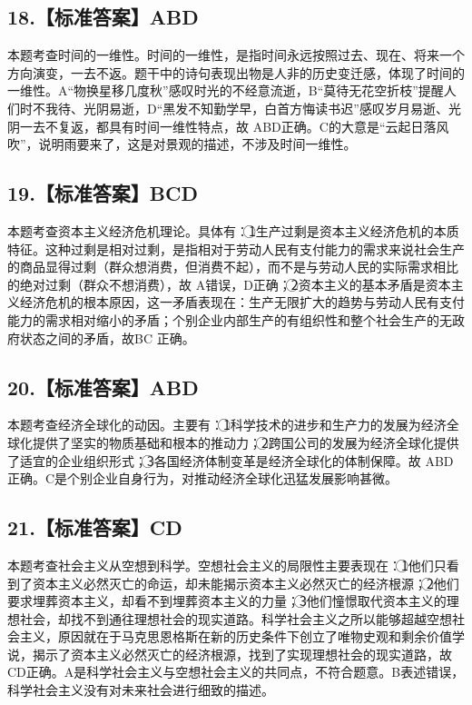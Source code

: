\documentclass[UTF8,11pt]{ctexart}
\begin{document}
\subsection*{18.【标准答案】ABD}

本题考查时间的一维性。时间的一维性，是指时间永远按照过去、现在、将来一个方向演变，一去不返。题干中的诗句表现出物是人非的历史变迁感，体现了时间的一维性。A“物换星移几度秋”感叹时光的不经意流逝，B“莫待无花空折枝”提醒人们时不我待、光阴易逝，D“黑发不知勤学早，白首方悔读书迟”感叹岁月易逝、光阴一去不复返，都具有时间一维性特点，故 ABD正确。C的大意是“云起日落风吹”，说明雨要来了，这是对景观的描述，不涉及时间一维性。


\subsection*{19.【标准答案】BCD}

本题考查资本主义经济危机理论。具体有：\textcircled{1}生产过剩是资本主义经济危机的本质特征。这种过剩是相对过剩，是指相对于劳动人民有支付能力的需求来说社会生产的商品显得过剩（群众想消费，但消费不起），而不是与劳动人民的实际需求相比的绝对过剩（群众不想消费），故 A错误，D正确；\textcircled{2}资本主义的基本矛盾是资本主义经济危机的根本原因，这一矛盾表现在：生产无限扩大的趋势与劳动人民有支付能力的需求相对缩小的矛盾；个别企业内部生产的有组织性和整个社会生产的无政府状态之间的矛盾，故BC 正确。


\subsection*{20.【标准答案】ABD}

本题考查经济全球化的动因。主要有：\textcircled{1}科学技术的进步和生产力的发展为经济全球化提供了坚实的物质基础和根本的推动力；\textcircled{2}跨国公司的发展为经济全球化提供了适宜的企业组织形式；\textcircled{3}各国经济体制变革是经济全球化的体制保障。故 ABD 正确。C是个别企业自身行为，对推动经济全球化迅猛发展影响甚微。


\subsection*{21.【标准答案】CD}

本题考查社会主义从空想到科学。空想社会主义的局限性主要表现在：\textcircled{1}他们只看到了资本主义必然灭亡的命运，却未能揭示资本主义必然灭亡的经济根源；\textcircled{2}他们要求埋葬资本主义，却看不到埋葬资本主义的力量；\textcircled{3}他们憧憬取代资本主义的理想社会，却找不到通往理想社会的现实道路。科学社会主义之所以能够超越空想社会主义，原因就在于马克思恩格斯在新的历史条件下创立了唯物史观和剩余价值学说，揭示了资本主义必然灭亡的经济根源，找到了实现理想社会的现实道路，故CD正确。A是科学社会主义与空想社会主义的共同点，不符合题意。B表述错误，科学社会主义没有对未来社会进行细致的描述。
\end{document}
